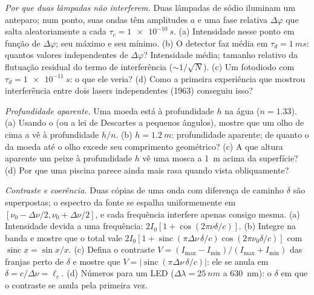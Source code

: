 \begin{exercise}[$\star\star$]\label{exo:b2:scalar-light-model:8}
\emph{Por que duas lâmpadas não interferem.} Duas lâmpadas de sódio iluminam um
anteparo; num ponto, suas ondas têm amplitudes $a$ e uma fase
relativa $\Delta\varphi$ que salta aleatoriamente a cada $\tau_c = \qty{1e-10}{s}$. (a)
Intensidade nesse ponto em função de $\Delta\varphi$; seu máximo e seu
mínimo. (b) O detector faz média em $\tau_d = \qty{1}{ms}$: quantos
valores independentes de $\Delta\varphi$? Intensidade média; tamanho relativo da
flutuação residual do termo de interferência ($\sim 1/\sqrt N$). (c) Um
fotodiodo com $\tau_d = \qty{1e-11}{s}$: o que ele veria? (d) Como a
primeira experiência que mostrou interferência entre dois lasers independentes
(1963) conseguiu isso?
\end{exercise}

\begin{exercise}[$\star\star$]\label{exo:b2:scalar-light-model:9}
\emph{Profundidade aparente.} Uma moeda está à profundidade $h$ na água ($n = 1.33$).
(a) Usando o  (ou a lei de Descartes a pequenos ângulos), mostre
que um olho de cima a vê à profundidade $h/n$. (b) $h = \qty{1.2}{m}$: profundidade
aparente; de quanto o  da moeda até o olho
excede seu comprimento geométrico? (c) A que altura aparente um peixe à profundidade $h$
vê uma mosca a \qty{1}{m} acima da superfície? (d) Por que uma piscina parece
ainda mais rasa quando vista obliquamente?
\end{exercise}

\begin{exercise}[$\star\star\star$]\label{exo:b2:scalar-light-model:10}
\emph{Contraste e coerência.} Duas cópias de uma onda com diferença de
caminho $\delta$ são superpostas; o espectro da fonte se espalha
uniformemente em $[\nu_0 - \Delta\nu/2, \nu_0 + \Delta\nu/2]$, e cada frequência
interfere apenas consigo mesma. (a) Intensidade devida a uma frequência: $2I_0
[1 + \cos(2\pi\nu\delta/c)]$. (b) Integre na banda e mostre que o
total vale $2I_0[1 + \operatorname{sinc}(\pi\Delta\nu\,\delta/c)\cos(2\pi\nu_0\delta/c)]$ com
$\operatorname{sinc}x = \sin x/x$. (c) Defina o contraste $V = (I_{\max} -
I_{\min})/(I_{\max} + I_{\min})$ das franjas perto de $\delta$ e mostre que $V =
|\operatorname{sinc}(\pi\Delta\nu\,\delta/c)|$: ele se anula em $\delta = c/\Delta\nu = \ell_c$. (d)
Números para um LED ($\Delta\lambda = \qty{25}{nm}$ a \qty{630}{nm}): o $\delta$ em que o
contraste se anula pela primeira vez.
\end{exercise}

